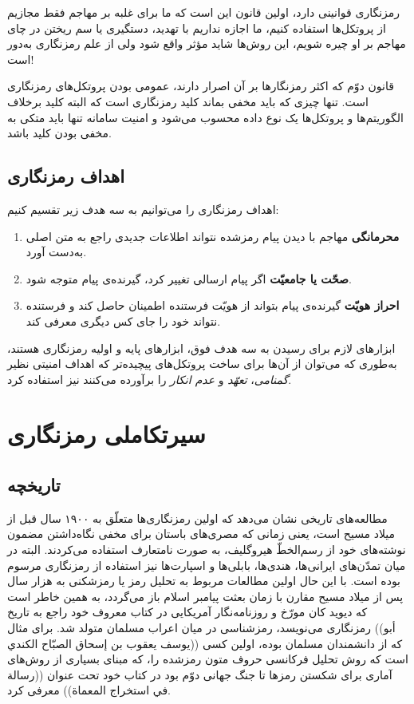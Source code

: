 رمزنگاری قوانینی دارد، اولین  قانون این است که ما برای غلبه بر مهاجم فقط مجازیم از پروتکل‌ها استفاده کنیم، ما اجازه نداریم با تهدید، دستگیری یا سم ریختن در چای مهاجم بر او چیره شویم، این روش‌ها شاید مؤثر  واقع شود ولی از علم رمزنگاری به‌دور است! 

قانون دوّم که اکثر رمزنگارها بر آن اصرار دارند، عمومی بودن پروتکل‌های رمزنگاری است. تنها چیزی که باید مخفی بماند کلید رمزنگاری است که البته کلید برخلاف الگوریتم‌ها و پروتکل‌ها یک نوع داده محسوب می‌شود  و امنیت سامانه  تنها باید  متکی به مخفی بودن کلید باشد.


\subsection*{اهداف رمزنگاری}
اهداف رمزنگاری را می‌توانیم به سه هدف زیر تقسیم کنیم:
\begin{enumerate}
	\item 
	 \textbf{محرمانگی}
	مهاجم با دیدن پیام رمزشده نتواند اطلاعات جدیدی راجع به متن اصلی به‌دست  آورد.
	\item
 \textbf{صحّت یا جامعیّت} 
	اگر پیام ارسالی تغییر کرد، گیرنده‌ی پیام متوجه  شود.
	\item
	\textbf{احراز هویّت}
	گیرنده‌ی پیام بتواند از هویّت فرستنده اطمینان حاصل کند و فرستنده نتواند خود را جای کس دیگری معرفی کند. 
\end{enumerate}
ابزارهای لازم برای رسیدن به سه هدف فوق، ابزارهای پایه‌  و اولیه رمزنگاری هستند،  به‌طوری که  می‌توان از آن‌ها برای ساخت پروتکل‌های پیچیده‌تر که اهداف امنیتی نظیر 
\textit{گمنامی}، 
\textit{تعهّد}
 و \textit{عدم‌ انکار}
 را برآورده می‌کنند نیز استفاده کرد.
\section{سیرتکاملی رمزنگاری}
\subsection*{تاریخچه}

مطالعه‌های تاریخی نشان می‌دهد که اولین  رمزنگاری‌ها
متعلّق به ۱۹۰۰ سال قبل از میلاد مسیح است، یعنی زمانی که مصری‌های باستان برای مخفی نگاه‌داشتن مضمون نوشته‌های خود از رسم‌الخطّ هیروگلیف، به صورت نامتعارف استفاده می‌کردند. البته در میان تمدّن‌های ایرانی‌ها، هندی‌ها، بابلی‌ها و اسپارت‌ها نیز استفاده از رمزنگاری مرسوم بوده است. با این حال اولین  مطالعات مربوط به تحلیل رمز یا رمزشکنی
به هزار سال پس از میلاد مسیح مقارن با زمان بعثت پیامبر اسلام باز می‌گردد، به همین خاطر است که دیوید کان
مورّخ و روزنامه‌نگار آمریکایی در کتاب معروف خود راجع به تاریخ رمزنگاری 
\cite{kahn1996code}
می‌نویسد، رمزشناسی
در میان اعراب مسلمان متولد شد. برای مثال ((أبو يوسف يعقوب بن إسحاق الصبّاح الكندي‎‎)) که از دانشمندان مسلمان بوده، اولین کسی است که روش تحلیل فرکانسی حروف متون رمزشده را، که مبنای بسیاری از روش‌های آماری برای شکستن رمز‌ها تا جنگ جهانی دوّم بود  در کتاب خود تحت عنوان ((رسالة في استخراج المعماة)) معرفی  کرد.


